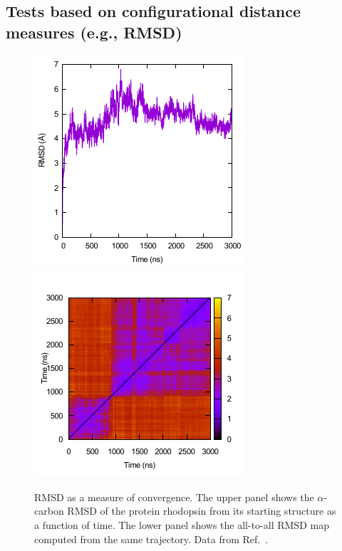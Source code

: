 \subsection{Tests based on configurational distance measures (e.g., RMSD)}
\label{sec:bio_RMSD}

\begin{figure}
  \centering
  \includegraphics[width=0.9\linewidth]{figures/rmsd}
  \includegraphics[width=0.9\linewidth]{figures/rmsds}
  \caption{RMSD as a measure of convergence.  The upper panel shows the
    $\alpha$-carbon RMSD of the protein rhodopsin from its starting structure as a
    function of time.  The lower panel shows the all-to-all RMSD map computed from the same
    trajectory.  Data from Ref.\ \cite{Grossfield-2015}.}
  \label{f:rmsd}
\end{figure}


